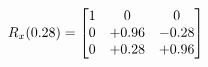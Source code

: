 \documentclass[preview]{standalone}
\begin{document}
\begin{align*}
\special{dvisvgm:raw <g id='unique000'>}R_{x}(0.28) = \begin{bmatrix}1 & 0 & 0 \\0 & +0.96 & -0.28 \\0 & +0.28 & +0.96\end{bmatrix}\special{dvisvgm:raw </g>}
\end{align*}
\end{document}
